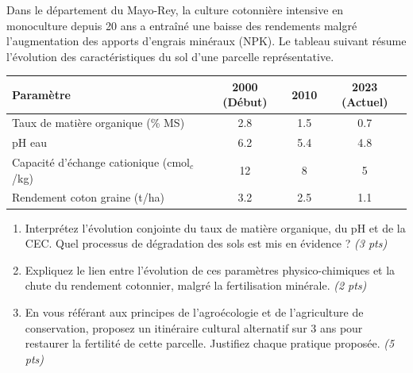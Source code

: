 \documentclass[11pt]{article}
\begin{document}
\begin{exercice}
\label{exo:sol_nord}
Dans le département du Mayo-Rey, la culture cotonnière intensive en monoculture depuis 20 ans a entraîné une baisse des rendements malgré l'augmentation des apports d'engrais minéraux (NPK). Le tableau suivant résume l'évolution des caractéristiques du sol d'une parcelle représentative.

\begin{tabular}{lccc}
\toprule
Paramètre & 2000 (Début) & 2010 & 2023 (Actuel) \\
\midrule
Taux de matière organique (\% MS) & 2.8 & 1.5 & 0.7 \\
pH eau & 6.2 & 5.4 & 4.8 \\
Capacité d'échange cationique (cmol$_c$/kg) & 12 & 8 & 5 \\
Rendement coton graine (t/ha) & 3.2 & 2.5 & 1.1 \\
\bottomrule
\end{tabular}

\begin{enumerate}
    \item Interprétez l'évolution conjointe du taux de matière organique, du pH et de la CEC. Quel processus de dégradation des sols est mis en évidence ? \textit{(3 pts)}
    \item Expliquez le lien entre l'évolution de ces paramètres physico-chimiques et la chute du rendement cotonnier, malgré la fertilisation minérale. \textit{(2 pts)}
    \item En vous référant aux principes de l'agroécologie et de l'agriculture de conservation, proposez un itinéraire cultural alternatif sur 3 ans pour restaurer la fertilité de cette parcelle. Justifiez chaque pratique proposée. \textit{(5 pts)}
\end{enumerate}
\end{exercice}
\end{document}
